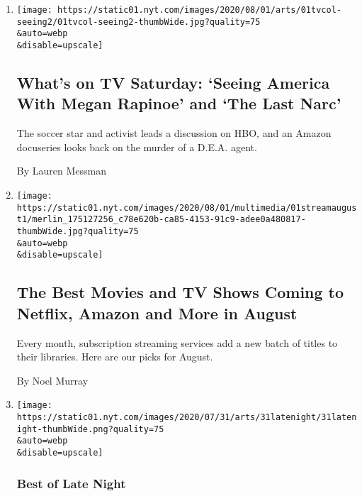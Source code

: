 \begin{enumerate}
\def\labelenumi{\arabic{enumi}.}
\item
  \href{/2020/08/01/arts/television/whats-on-tv-saturday-seeing-america-with-megan-rapinoe-and-the-last-narc.html}{}

  \texttt{[image: https://static01.nyt.com/images/2020/08/01/arts/01tvcol-seeing2/01tvcol-seeing2-thumbWide.jpg?quality=75\\\&auto=webp\\\&disable=upscale]}

  \hypertarget{whats-on-tv-saturday-seeing-america-with-megan-rapinoe-and-the-last-narc}{%
  \subsection{What's on TV Saturday: `Seeing America With Megan Rapinoe'
  and `The Last
  Narc'}\label{whats-on-tv-saturday-seeing-america-with-megan-rapinoe-and-the-last-narc}}

  The soccer star and activist leads a discussion on HBO, and an Amazon
  docuseries looks back on the murder of a D.E.A. agent.

  By Lauren Messman
\item
  \href{/2020/07/31/arts/television/new-to-stream-netflix.html}{}

  \texttt{[image: https://static01.nyt.com/images/2020/08/01/multimedia/01streamaugust1/merlin\_175127256\_c78e620b-ca85-4153-91c9-adee0a480817-thumbWide.jpg?quality=75\\\&auto=webp\\\&disable=upscale]}

  \hypertarget{the-best-movies-and-tv-shows-coming-to-netflix-amazon-and-more-in-august}{%
  \subsection{The Best Movies and TV Shows Coming to Netflix, Amazon and
  More in
  August}\label{the-best-movies-and-tv-shows-coming-to-netflix-amazon-and-more-in-august}}

  Every month, subscription streaming services add a new batch of titles
  to their libraries. Here are our picks for August.

  By Noel Murray
\item
  \href{/2020/07/31/arts/television/late-night-trump-delay-election.html}{}

  \texttt{[image: https://static01.nyt.com/images/2020/07/31/arts/31latenight/31latenight-thumbWide.png?quality=75\\\&auto=webp\\\&disable=upscale]}

  \hypertarget{best-of-late-night}{%
  \subsubsection{Best of Late Night}\label{best-of-late-night}}


\end{enumerate}
